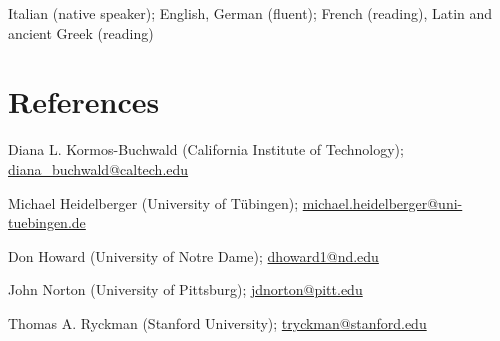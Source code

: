 \documentclass{article}
\renewenvironment{itemize}{
  \begin{list}{}{
    \setlength{\leftmargin}{1.5em}
  }
}{
  \end{list}
}
\begin{document}
\begin{itemize}

\item Italian (native speaker); English, German (fluent); French (reading), Latin and ancient Greek (reading)

\end{itemize}




\section*{References}

\begin{itemize}
\item Diana L. Kormos-Buchwald (California Institute of Technology); \href{mailto:diana\_buchwald@caltech.edu}{diana\_buchwald@caltech.edu}
\item Michael Heidelberger (University of T\"ubingen); \href{mailto:michael.heidelberger@uni-tuebingen.de}{michael.heidelberger@uni-tuebingen.de }
\item Don Howard (University of Notre Dame); \href{mailto:dhoward1@nd.edu}{dhoward1@nd.edu}
\item John Norton (University of Pittsburg); \href{mailto:jdnorton@pitt.edu }{jdnorton@pitt.edu }
\item Thomas A. Ryckman (Stanford University); \href{mailto:tryckman@stanford.edu}{tryckman@stanford.edu}
\end{itemize}
\end{document}
